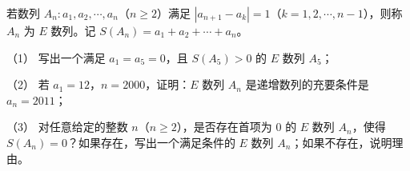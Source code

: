 \begin{question}
若数列 $A_n:a_1,a_2,\cdots,a_n$（$n\geqslant 2$）满足 $|a_{n+1}-a_k|=1$（$k=1,2,\cdots,n-1$），则称 $A_n$ 为 $E$ 数列。记 $S(A_n)=a_1+a_2+\cdots+a_n$。

（1） 写出一个满足 $a_1=a_5=0$，且 $S(A_5)>0$ 的 $E$ 数列 $A_5$；

（2） 若 $a_1=12$，$n=2000$，证明：$E$ 数列 $A_n$ 是递增数列的充要条件是 $a_n=2011$；

（3） 对任意给定的整数 $n$（$n\geqslant 2$），是否存在首项为 $0$ 的 $E$ 数列 $A_n$，使得 $S(A_n)=0$？如果存在，写出一个满足条件的 $E$ 数列 $A_n$；如果不存在，说明理由。

\end{question}